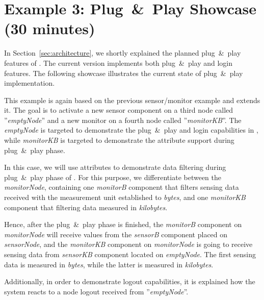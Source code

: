 %
% 
%
%
%

\section{Example 3: Plug~\&~Play Showcase (30 minutes)}
\label{sec:example_pnp}

In Section~\ref{sec:architecture}, we shortly explained the planned plug~\&~play features of \xme.
The current version implements both plug~\&~play and login features.
The following showcase illustrates the current state of plug~\&~play implementation.

This example is again based on the previous sensor/monitor example and extends it.
The goal is to activate a new sensor component on a third node called ''\emph{emptyNode}'' and a new monitor on a fourth node called ''\emph{monitorKB}''.
The \emph{emptyNode} is targeted to demonstrate the plug~\&~play and login capabilities in \xme, while \emph{monitorKB} is targeted to demonstrate 
the attribute support during plug~\&~play phase. 

In this case, we will use attributes to demonstrate data filtering during plug~\&~play phase of \xme. For this purpose, we differentiate
between the \emph{monitorNode}, containing one \emph{monitorB} component that filters sensing data received with the measurement unit
established to \emph{bytes}, and one \emph{monitorKB} component that filtering data measured in \emph{kilobytes}.

Hence, after the plug~\&~play phase is finished, the \emph{monitorB} component on \emph{monitorNode} will receive values from the \emph{sensorB} component placed on
\emph{sensorNode}, and the \emph{monitorKB} component on \emph{monitorNode} is going to receive sensing data from \emph{sensorKB} component located on \emph{emptyNode}.
The first sensing data is measured in \emph{bytes}, while the latter is measured in \emph{kilobytes}.

Additionally, in order to demonstrate logout capabilities, it is explained how the system reacts to a node logout received from ''\emph{emptyNode}''. 


